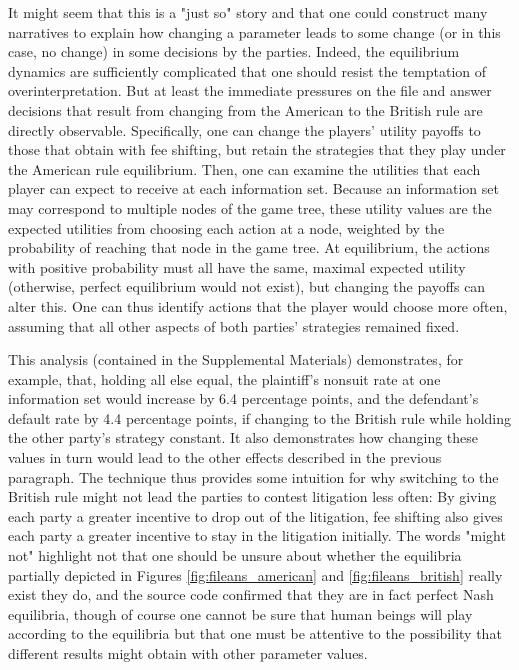 \documentclass{article}
\begin{document}
It might seem that this is a "just so" story and that one could construct many narratives to explain how changing a parameter leads to some change (or in this case, no change) in some decisions by the parties. Indeed, the equilibrium dynamics are sufficiently complicated that one should resist the temptation of overinterpretation. But at least the immediate pressures on the file and answer decisions that result from changing from the American to the British rule are directly observable. Specifically, one can change the players' utility payoffs to those that obtain with fee shifting, but retain the strategies that they play under the American rule equilibrium. Then, one can examine the utilities that each player can expect to receive at each information set. Because an information set may correspond to multiple nodes of the game tree, these utility values are the expected utilities from choosing each action at a node, weighted by the probability of reaching that node in the game tree. At equilibrium, the actions with positive probability must all have the same, maximal expected utility (otherwise, perfect equilibrium would not exist), but changing the payoffs can alter this. One can thus identify actions that the player would choose more often, assuming that all other aspects of both parties' strategies remained fixed. 

This analysis (contained in the Supplemental Materials) demonstrates, for example, that, holding all else equal, the plaintiff's nonsuit rate at one information set would increase by 6.4 percentage points, and the defendant's default rate by 4.4 percentage points, if changing to the British rule while holding the other party's strategy constant. It also demonstrates how changing these values in turn would lead to the other effects described in the previous paragraph. The technique thus provides some intuition for why switching to the British rule might not lead the parties to contest litigation less often: By giving each party a greater incentive to drop out of the litigation, fee shifting also gives each party a greater incentive to stay in the litigation initially. The words "might not" highlight not that one should be unsure about whether the equilibria partially depicted in Figures \ref{fig:fileans_american} and \ref{fig:fileans_british} really exist \textemdash they do, and the source code confirmed that they are in fact perfect Nash equilibria, though of course one cannot be sure that human beings will play according to the equilibria \textemdash but that one must be attentive to the possibility that different results might obtain with other parameter values. 
\end{document}
